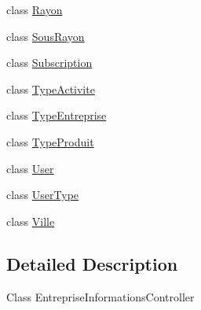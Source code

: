 \begin{DoxyCompactItemize}
class \mbox{\hyperlink{class_app_1_1_rayon}{Rayon}}
\item 
class \mbox{\hyperlink{class_app_1_1_sous_rayon}{Sous\+Rayon}}
\item 
class \mbox{\hyperlink{class_app_1_1_subscription}{Subscription}}
\item 
class \mbox{\hyperlink{class_app_1_1_type_activite}{Type\+Activite}}
\item 
class \mbox{\hyperlink{class_app_1_1_type_entreprise}{Type\+Entreprise}}
\item 
class \mbox{\hyperlink{class_app_1_1_type_produit}{Type\+Produit}}
\item 
class \mbox{\hyperlink{class_app_1_1_user}{User}}
\item 
class \mbox{\hyperlink{class_app_1_1_user_type}{User\+Type}}
\item 
class \mbox{\hyperlink{class_app_1_1_ville}{Ville}}
\end{DoxyCompactItemize}


\subsection{Detailed Description}
Class Entreprise\+Informations\+Controller  
